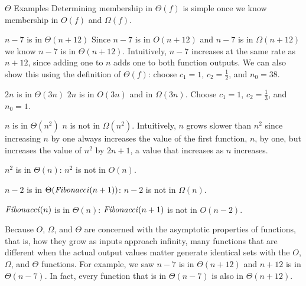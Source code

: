 \begin{schemeregion}
\begin{example}{$\Theta$ Examples}
Determining membership in $\Theta(f)$ is simple once we know membership in $O(f)$ and $\Omega(f)$.
\begin{descriptionlist}
\item[$n-7$ is in $\Theta(n+12)$]\forcenl 
Since $n-7$ is in $O(n+12)$ and $n-7$ is in $\Omega(n+12)$ we know $n-7$ is in $\Theta(n+12)$.  Intuitively, $n-7$ increases at the same rate as $n+12$, since adding one to $n$ adds one to both function outputs.  We can also show this using the definition of $\Theta(f)$: choose $c_1 = 1$, $c_2 = \frac{1}{2}$, and $n_0 = 38$. 
\item[$2n$ is in $\Theta(3n)$]\forcenl $2n$ is in $O(3n)$ and in $\Omega(3n)$.  Choose $c_1 = 1$, $c_2 = \frac{1}{3}$, and $n_0 = 1$.
\item[$n$ is \bold{not} in $\Theta(n^2)$]\forcenl $n$ is not in $\Omega(n^2)$.  Intuitively, $n$ grows slower than $n^2$ since increasing $n$ by one always increases the value of the first function, $n$, by one, but increases the value of $n^2$ by $2n + 1$, a value that increases as $n$ increases.
\item[$n^2$ is \bold{not} in $\Theta(n)$:] $n^2$ is not in $O(n)$.  
\item[$n-2$ is \bold{not} in $\Theta(\textrm{\emph{Fibonacci}}(n+1))$:] $n-2$ is not in $\Omega(n)$.
\item[$\textrm{\emph{Fibonacci}}(n)$ is \bold{not} in $\Theta(n)$:] $\textrm{\emph{Fibonacci}}(n+1)$ is not in $O(n-2)$.
\end{descriptionlist}
\end{example}

 Because $O$, $\Omega$, and $\Theta$ are concerned with the asymptotic properties of functions, that is, how they grow as inputs approach infinity, many functions that are different when the actual output values matter generate identical sets with the $O$, $\Omega$, and $\Theta$ functions.  For example, we saw $n-7$ is in $\Theta(n+12)$ and $n+12$ is in $\Theta(n-7)$.  In fact, every function that is in $\Theta(n-7)$ is also in $\Theta(n+12)$.  


\end{schemeregion}
